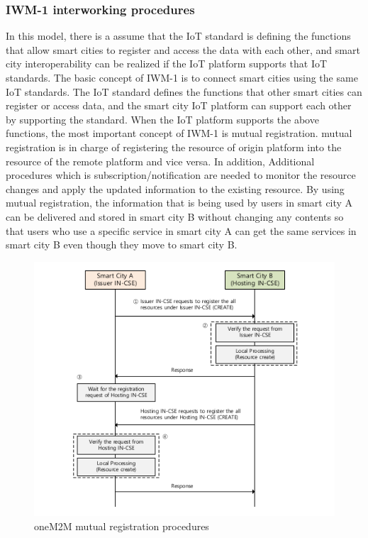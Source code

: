 \subsubsection{IWM-1 interworking procedures}
In this model, there is a assume that the IoT standard is defining the functions that allow smart cities to register and access the data with each other, and smart city interoperability can be realized if the IoT platform supports that IoT standards. The basic concept of IWM-1 is to connect smart cities using the same IoT standards. The IoT standard defines the functions that other smart cities can register or access data, and the smart city IoT platform can support each other by supporting the standard. When the IoT platform supports the above functions, the most important concept of IWM-1 is mutual registration. mutual registration is in charge of registering the resource of origin platform into the resource of the remote platform and vice versa. In addition, Additional procedures which is subscription/notification are needed to monitor the resource changes and apply the updated information to the existing resource. By using mutual registration, the information that is being used by users in smart city A can be delivered and stored in smart city B without changing any contents so that users who use a specific service in smart city A can get the same services in smart city B even though they move to smart city B.

\begin{figure}[H]		
	\centering
	\includegraphics[width=\textwidth]{figures/fig_iwm1_mutual_registration_procedures.pdf}
    \caption{oneM2M mutual registration procedures}
    \label{fig:oneM2M_mutual_registration_procedures}
\end{figure}

